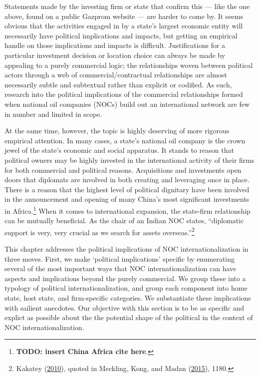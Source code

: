 \documentclass[11pt,]{book}
\begin{document}
Statements made by the investing firm or state that confirm this --- like the one above, found on a public Gazprom website --- are harder to come by. It seems obvious that the activities engaged in by a state's largest economic entity will necessarily have political implications and impacts, but getting an empirical handle on those implications and impacts is difficult. Justifications for a particular investment decision or location choice can always be made by appealing to a purely commercial logic; the relationships woven between political actors through a web of commercial/contractual relationships are almost necessarily subtle and subtextual rather than explicit or codified. As such, research into the political implications of the commercial relationships formed when national oil companies (NOCs) build out an international network are few in number and limited in scope.

At the same time, however, the topic is highly deserving of more rigorous empirical attention. In many cases, a state's national oil company is the crown jewel of the state's economic and social apparatus. It stands to reason that political owners may be highly invested in the international activity of their firms for both commercial and political reasons. Acquisitions and investments open doors that diplomats are involved in both creating and leveraging once in place. There is a reason that the highest level of political dignitary have been involved in the announcement and opening of many China's most significant investments in Africa.\footnote{\textbf{TODO: insert China Africa cite here}.} When it comes to international expansion, the state-firm relationship can be mutually beneficial. As the chair of an Indian NOC states, ``diplomatic support is very, very crucial as we search for assets overseas.''\footnote{Kakatey (\protect\hyperlink{ref-kakatey_india_2010}{2010}), quoted in Meckling, Kong, and Madan (\protect\hyperlink{ref-meckling_oil_2015}{2015}), 1180.}

This chapter addresses the political implications of NOC internationalization in three moves. First, we make `political implications' specific by enumerating several of the most important ways that NOC internationalization can have aspects and implications beyond the purely commercial. We group these into a typology of political internationalization, and group each component into home state, host state, and firm-specific categories. We substantiate these implications with sailient anecdotes. Our objective with this section is to be as specific and explict as possible about the the potential shape of the political in the context of NOC internationalization.
\end{document}
